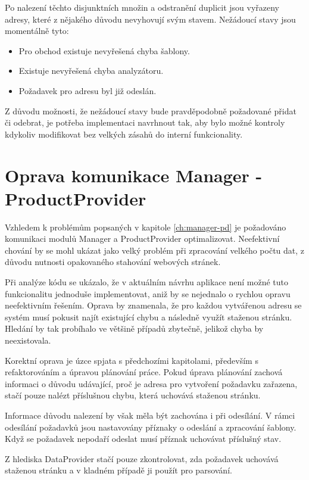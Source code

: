 \documentclass[thesis=B,czech]{FITthesis}[2012/06/26]
\begin{document}
Po nalezení těchto disjunktních množin a odstranění duplicit jsou vyřazeny adresy, které z nějakého důvodu nevyhovují svým stavem.
Nežádoucí stavy jsou momentálně tyto:

\begin{itemize}
\item Pro obchod existuje nevyřešená chyba šablony.
\item Existuje nevyřešená chyba analyzátoru.
\item Požadavek pro adresu byl již odeslán.
\end{itemize}

Z důvodu možnosti, že nežádoucí stavy bude pravděpodobně požadované přidat či odebrat, je potřeba implementaci navrhnout tak, aby bylo možné kontroly kdykoliv modifikovat bez velkých zásahů do interní funkcionality.

\section{Oprava komunikace Manager - ProductProvider}
Vzhledem k problémům popsaných v kapitole \ref{ch:manager-pd} je požadováno komunikaci modulů Manager a ProductProvider optimalizovat.
Neefektivní chování by se mohl ukázat jako velký problém při zpracování velkého počtu dat, z důvodu nutnosti opakovaného
stahování webových stránek. 
\par
Při analýze kódu se ukázalo, že v aktuálním návrhu aplikace není možné tuto funkcionalitu jednoduše implementovat, aniž by se nejednalo o rychlou opravu neefektivním řešením. Oprava by znamenala, že pro každou vytvářenou adresu se systém musí pokusit najít
existující chybu a následně využít staženou stránku. Hledání by tak probíhalo ve většině případů zbytečně, jelikož chyba by neexistovala.
\par
Korektní oprava je úzce spjata s předchozími kapitolami, především s refaktorováním a úpravou plánování práce. Pokud úprava plánování zachová
informaci o důvodu udávající, proč je adresa pro vytvoření požadavku zařazena, stačí pouze nalézt příslušnou chybu, která uchovává staženou stránku.
\par
Informace důvodu nalezení by však měla být zachována i při odesílání. V rámci odesílání požadavků jsou nastavovány příznaky o odeslání a zpracování šablony. Když se požadavek nepodaří odeslat musí příznak uchovávat příslušný stav. 
\par
Z hlediska DataProvider stačí pouze zkontrolovat, zda požadavek uchovává staženou stránku a v kladném případě ji použít pro
parsování.
\end{document}
